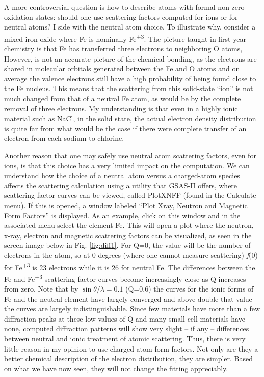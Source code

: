 A more controversial question is how to describe atoms with formal non-zero oxidation states: should one use scattering factors computed for ions or for neutral atoms? I side with the neutral atom choice. To illustrate why, consider a mixed iron oxide where Fe is nominally Fe\textsuperscript{+3}. The picture taught in first-year chemistry is that Fe has transferred three electrons to neighboring O atoms, However, is not an accurate picture of the chemical bonding, as the electrons are shared in molecular orbitals generated between the Fe and O atoms and on average the valence electrons still have a high probability of being found close to the Fe nucleus. This means that the scattering from this solid-state “ion” is not much changed from that of a neutral Fe atom, as would be by the complete removal of three electrons. My understanding is that even in a highly ionic material such as NaCl, in the solid state, the actual electron density distribution is quite far from what would be the case if there were complete transfer of an electron from each sodium to chlorine. 

Another reason that one may safely use neutral atom scattering factors, even for ions, is that this choice has a very limited impact on the computation. We can understand how the choice of a neutral atom versus a charged-atom species affects the scattering calculation using a utility that GSAS-II offers, where scattering factor curves can be viewed, called PlotXNFF (found in the Calculate menu). If this is opened, a window labeled “Plot Xray, Neutron and Magnetic Form Factors” is displayed. As an example, click on this window and in the associated menu select the element Fe. This will open a plot where the neutron, x-ray, electron and magnetic scattering factors can be visualized, as seen in the screen image below in Fig. \ref{fig:diff1}. For Q=0, the value will be the number of electrons in the atom, so at 0 degrees (where one cannot measure scattering) \textit{f}(0) for Fe\textsuperscript{+3} is 23 electrons while it is 26 for neutral Fe. The differences between the Fe and Fe\textsuperscript{+3} scattering factor curves become increasingly close as Q increases from zero. Note that by $\sin\theta/\lambda=0.1$ (Q=0.6) the curves for the ionic forms of Fe and the neutral element have largely converged and above double that value the curves are largely indistinguishable. Since few materials have more than a few diffraction peaks at these low values of Q and many small-cell materials have none, computed diffraction patterns will show very slight – if any – differences between neutral and ionic treatment of atomic scattering. Thus, there is very little reason in my opinion to use charged atom form factors. Not only are they a better chemical description of the electron distribution, they are simpler. Based on what we have now seen, they will not change the fitting appreciably.

